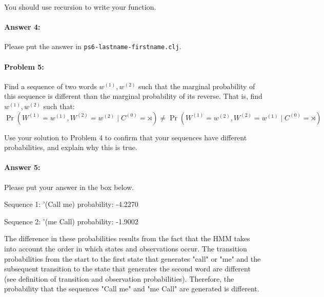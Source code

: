 \documentclass[10pt]{article}
\newenvironment{AnswerBox}{\begin{mdframed}[style=simple]}{\end{mdframed}}
\newcommand{\PSnum}{6}
\begin{document}
You should use recursion to write your function. 

\paragraph{Answer 4:} Please put the answer in
\texttt{ps\PSnum-lastname-firstname.clj}.

\hrulefill%

\paragraph{Problem 5:}
Find a sequence of two words $w^{(1)},w^{(2)}$ such that the marginal
probability of this sequence is different than the marginal
probability of its reverse. That is, find $w^{(1)},w^{(2)}$ such that:
\begin{equation*}
  \Pr(W^{(1)}=w^{(1)}, W^{(2)} =w^{(2)} \mid C^{(0)}=\rtimes )
  \neq \Pr(W^{(1)}=w^{(2)}, W^{(2)} =w^{(1)} \mid C^{(0)}=\rtimes )
\end{equation*}

Use your solution to Problem 4 to confirm that your sequences have
different probabilities, and explain why this is true.

\paragraph{Answer 5:} Please put your answer in the box below.

\begin{AnswerBox}%

    Sequence 1: '(Call me)  probability: -4.2270

    Sequence 2: '(me Call)  probability: -1.9002

    The difference in these probabilities results from the fact that the HMM takes into account the order in which states and observations occur. The transition probabilities from the start to the first state that generates "call" or "me" and the subsequent transition to the state that generates the second word are different (see definition of transition and observation probabilities). Therefore, the probability that the sequences "Call me" and "me Call" are generated is different.

\end{AnswerBox}%

\hrulefill%
\end{document}
